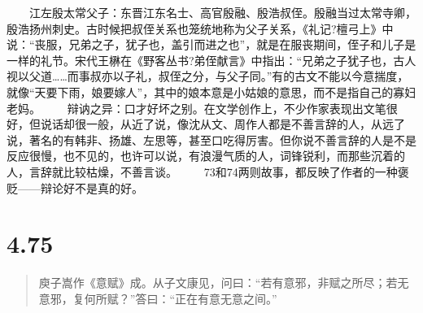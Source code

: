 \documentclass[]{book}
\begin{document}
　　江左殷太常父子：东晋江东名士、高官殷融、殷浩叔侄。殷融当过太常寺卿，殷浩扬州刺史。古时候把叔侄关系也笼统地称为父子关系，《礼记?檀弓上》中说：``丧服，兄弟之子，犹子也，盖引而进之也''，就是在服丧期间，侄子和儿子是一样的礼节。宋代王楙在《野客丛书?弟侄献言》中指出：``兄弟之子犹子也，古人视以父道\ldots{}\ldots{}而事叔亦以子礼，叔侄之分，与父子同。''有的古文不能以今意揣度，就像``天要下雨，娘要嫁人''，其中的娘本意是小姑娘的意思，而不是指自己的寡妇老妈。
　　辩讷之异：口才好坏之别。在文学创作上，不少作家表现出文笔很好，但说话却很一般，从近了说，像沈从文、周作人都是不善言辞的人，从远了说，著名的有韩非、扬雄、左思等，甚至口吃得厉害。但你说不善言辞的人是不是反应很慢，也不见的，也许可以说，有浪漫气质的人，词锋锐利，而那些沉着的人，言辞就比较枯燥，不善言谈。
　　73和74两则故事，都反映了作者的一种褒贬------辩论好不是真的好。

\section{4.75}\label{section-252}

\begin{quote}
庾子嵩作《意赋》成。从子文康见，问曰：``若有意邪，非赋之所尽；若无意邪，复何所赋？''答曰：``正在有意无意之间。''
\end{quote}
\end{document}
